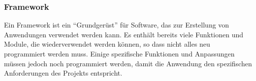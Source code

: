 \subsubsection{Framework}

Ein Framework ist ein \enquote{Grundgerüst} für Software, das zur Erstellung von Anwendungen verwendet werden kann.
Es enthält bereits viele Funktionen und Module, die wiederverwendet werden können, so dass nicht alles neu programmiert werden muss.
Einige spezifische Funktionen und Anpassungen müssen jedoch noch programmiert werden, damit die Anwendung den spezifischen Anforderungen des Projekts entspricht.
\cite{intro:framework}
